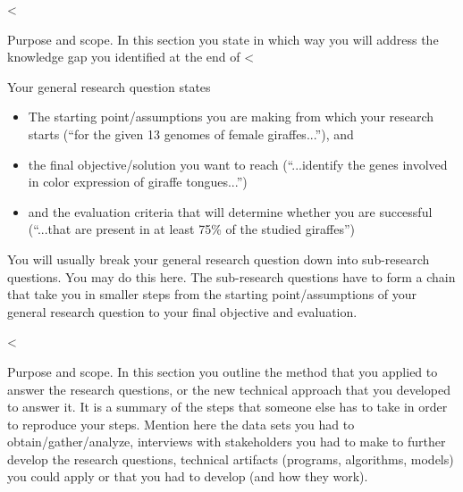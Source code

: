 \documentclass[runningheads,a4paper,english]{llncs}[2018/03/10]
\begin{document}
{%
<%

\textsf{Purpose and scope}. In this section you state in which way you will address the knowledge gap you identified at the end of <%

Your general research question states
\begin{itemize}
    \item The starting point/assumptions you are making from which your research starts (``for the given 13 genomes of female giraffes...''), and
    \item the final objective/solution you want to reach (``...identify the genes involved in color expression of giraffe tongues...'')
    \item and the evaluation criteria that will determine whether you are successful (``...that are present in at least 75\% of the studied giraffes'')
\end{itemize}

You will usually break your general research question down into sub-research questions. You may do this here. The sub-research questions have to form a chain that take you in smaller steps from the starting point/assumptions of your general research question to your final objective and evaluation.

<%
 
\textsf{Purpose and scope}. In this section you outline the method that you applied to answer the research questions, or the new technical approach that you developed to answer it. It is a summary of the steps that someone else has to take in order to reproduce your steps. Mention here the data sets you had to obtain/gather/analyze, interviews with stakeholders you had to make to further develop the research questions, technical artifacts (programs, algorithms, models) you could apply or that you had to develop (and how they work).

}
\end{document}
